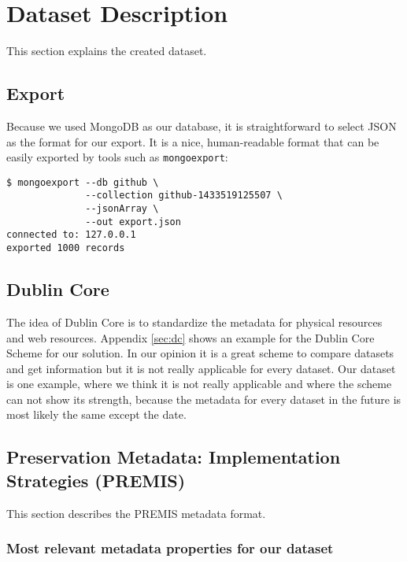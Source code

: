 \section{Dataset Description}\label{sec:dataset-description}

This section explains the created dataset.

\subsection{Export}\label{sec:export}

Because we used MongoDB as our database, it is straightforward to select JSON as the
format for our export. It is a nice, human-readable format that can be easily
exported by tools such as \texttt{mongoexport}:

\begin{lstlisting}
$ mongoexport --db github \
              --collection github-1433519125507 \
              --jsonArray \
              --out export.json
connected to: 127.0.0.1
exported 1000 records
\end{lstlisting}

\subsection{Dublin Core}\label{sec:dublin}

The idea of Dublin Core is to standardize the metadata for physical resources
and web resources. Appendix \ref{sec:dc} shows an example for the Dublin Core
Scheme for our solution. In our opinion it is a great scheme to compare datasets
and get information but it is not really applicable for every dataset. Our
dataset is one example, where we think it is not really applicable and where the
scheme can not show its strength, because the metadata for every dataset in
the future is most likely the same except the date. 

\subsection{Preservation Metadata: Implementation Strategies (PREMIS)}\label{sec:premis}
This section describes the PREMIS metadata format.

\subsubsection{Most relevant metadata properties for our
dataset}\label{sec:propertylist}

